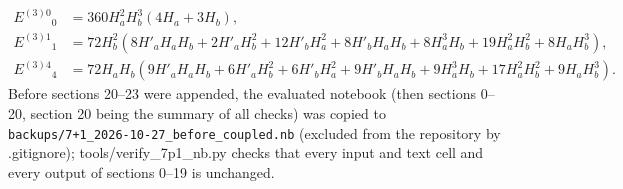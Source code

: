 \documentclass[10pt,a4paper]{article}
\begin{document}
\begin{align*}
E^{(3)0}{}_0&=360 H_{a}^{2} H_{b}^{3} \left(4 H_{a} + 3 H_{b}\right), \\
E^{(3)1}{}_1&=72 H_{b}^{2} \left(8 H'_{a} H_{a} H_{b} + 2 H'_{a} H_{b}^{2} + 12 H'_{b} H_{a}^{2} + 8 H'_{b} H_{a} H_{b} + 8 H_{a}^{3} H_{b} + 19 H_{a}^{2} H_{b}^{2} + 8 H_{a} H_{b}^{3}\right), \\
E^{(3)4}{}_4&=72 H_{a} H_{b} \left(9 H'_{a} H_{a} H_{b} + 6 H'_{a} H_{b}^{2} + 6 H'_{b} H_{a}^{2} + 9 H'_{b} H_{a} H_{b} + 9 H_{a}^{3} H_{b} + 17 H_{a}^{2} H_{b}^{2} + 9 H_{a} H_{b}^{3}\right).
\end{align*}
Before sections 20–23 were appended, the evaluated notebook (then sections 0–20, section 20 being the summary of all checks) was copied to \texttt{backups/\allowbreak{}7+1\_\allowbreak{}2026-10-27\_\allowbreak{}before\_\allowbreak{}coupled.nb} (excluded from the repository by .gitignore); tools/verify\_7p1\_nb.py checks that every input and text cell and every output of sections 0–19 is unchanged.
\end{document}
